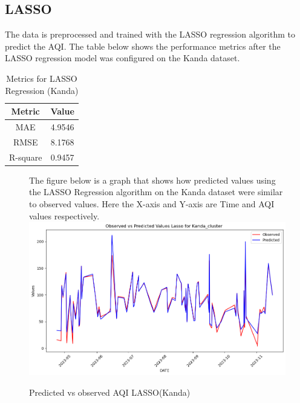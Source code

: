 \documentclass{book}
\numberwithin{equation}{section}
\numberwithin{figure}{section}
\begin{document}
\subsection{LASSO}
The data is preprocessed and trained with the LASSO regression algorithm to predict the AQI. The table below shows the performance metrics after the LASSO regression model was configured on the Kanda dataset.\\
\begin{table}[H]
    \centering
    \begin{tabular}{|c|c|}
        \hline
        \textbf{Metric} & \textbf{Value} \\
        \hline
        MAE & 4.9546 \\
        \hline
        RMSE & 8.1768 \\
        \hline
        R-square & 0.9457 \\
        \hline
    \end{tabular}
    \caption{Metrics for LASSO Regression (Kanda)}
    \label{tab: LASSO metrics(Kanda)}
\end{table}
\begin{figure}[H]
 \begin{minipage}{\linewidth}
        The figure below is a graph that shows how predicted values using the LASSO Regression algorithm on the Kanda dataset were similar to observed values. Here the X-axis and Y-axis are Time and AQI values respectively.
        \vspace{0.5em} 
        \includegraphics[width=\linewidth]{kanda LASSO.png}
       
        \caption{ Predicted vs observed AQI LASSO(Kanda)}
        \label{fig: LASSO Predicted vs observed AQI(Kanda)}
    \end{minipage}
\end{figure}
\end{document}
